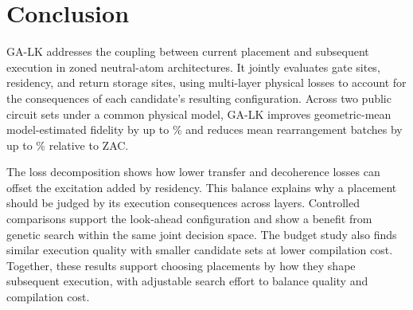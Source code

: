 \section{Conclusion}
\label{sec:discussion}
\label{sec:conclusion}

GA-LK addresses the coupling between current placement and subsequent execution in zoned neutral-atom architectures. It jointly evaluates gate sites, residency, and return storage sites, using multi-layer physical losses to account for the consequences of each candidate's resulting configuration. Across two public circuit sets under a common physical model, GA-LK improves geometric-mean model-estimated fidelity by up to \GAMainMaxDatasetFidelityGain\% and reduces mean rearrangement batches by up to \GAMainMaxDatasetBatchReduction\% relative to ZAC.

The loss decomposition shows how lower transfer and decoherence losses can offset the excitation added by residency. This balance explains why a placement should be judged by its execution consequences across layers. Controlled comparisons support the look-ahead configuration and show a benefit from genetic search within the same joint decision space. The budget study also finds similar execution quality with smaller candidate sets at lower compilation cost. Together, these results support choosing placements by how they shape subsequent execution, with adjustable search effort to balance quality and compilation cost.

